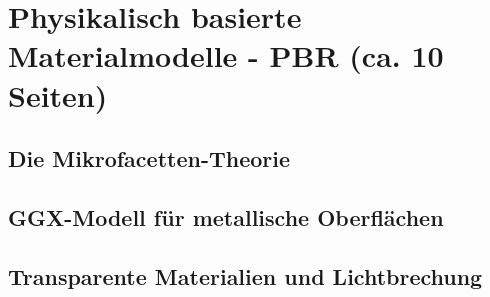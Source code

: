 \section{Physikalisch basierte Materialmodelle - PBR (ca. 10 Seiten)}

\subsection{Die Mikrofacetten-Theorie}
\subsection{GGX-Modell für metallische Oberflächen}
\subsection{Transparente Materialien und Lichtbrechung}
